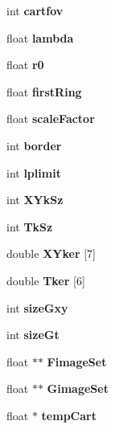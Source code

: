 \begin{DoxyCompactItemize}
\item 
int {\bfseries cartfov}\label{classoFlow_a572231a6c91976963b532148fc5615ad}

\item 
float {\bfseries lambda}\label{classoFlow_ad4db63cb00ea73b7691d1ccf24d194fe}

\item 
float {\bfseries r0}\label{classoFlow_afb40ce6ad8e854a970762bfa9f67f22a}

\item 
float {\bfseries first\+Ring}\label{classoFlow_acd85e387f2b2ba8c2a4dfae428a58c44}

\item 
float {\bfseries scale\+Factor}\label{classoFlow_abef6a9573ef6e8a61af177e8a5c0ab15}

\item 
int {\bfseries border}\label{classoFlow_a7424079e75d682376b7307bb94370903}

\item 
int {\bfseries lplimit}\label{classoFlow_a9c531d82c72cbfc8df356ac81a8ef500}

\item 
int {\bfseries X\+Yk\+Sz}\label{classoFlow_ae6edd9316ba3389359b2d6a2ab9bfa45}

\item 
int {\bfseries Tk\+Sz}\label{classoFlow_ac58599fa223cc53443f08e078e6f8927}

\item 
double {\bfseries X\+Yker} \mbox{[}7\mbox{]}\label{classoFlow_acfac7a01b3c3450159bc7373147fe4a0}

\item 
double {\bfseries Tker} \mbox{[}6\mbox{]}\label{classoFlow_a91f1b8054094e24f56cd8851992f02ac}

\item 
int {\bfseries size\+Gxy}\label{classoFlow_a15f98b7e0592ba8c056b614fd5bcc123}

\item 
int {\bfseries size\+Gt}\label{classoFlow_ae40fd7ebc9c5a58ba6f8fc95dbe89f6b}

\item 
float $\ast$$\ast$ {\bfseries Fimage\+Set}\label{classoFlow_aa5da912decc33e1ab14817f29f8d695f}

\item 
float $\ast$$\ast$ {\bfseries Gimage\+Set}\label{classoFlow_ad8ca38cbca8e1bd53ac4e7353dc6939d}

\item 
float $\ast$ {\bfseries temp\+Cart}\label{classoFlow_a9918168f0e0b430285c2b5ecf782dbc7}


\end{DoxyCompactItemize}
